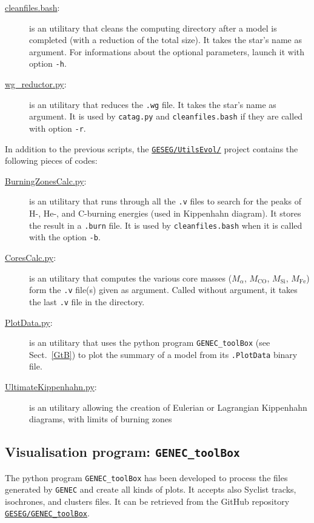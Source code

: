 \documentclass[11pt]{article}
\begin{document}
\begin{description}
\item[\underline{cleanfiles.bash}:] is an utilitary that cleans the computing directory after a model is completed (with a reduction of the total size). It takes the star's name as argument. For informations about the optional parameters, launch it with option \verb?-h?.
\item[\underline{wg\_reductor.py}:] is an utilitary that reduces the {\tt .wg} file. It takes the star's name as argument. It is used by {\tt catag.py} and {\tt cleanfiles.bash} if they are called with option \verb?-r?.
\end{description}

In addition to the previous scripts, the \href{https://github.com/GESEG/UtilsEvol}{\tt GESEG/UtilsEvol/} project contains the following pieces of codes:
\begin{description}
\item[\underline{BurningZonesCalc.py}:] is an utilitary that runs through all the {\tt .v} files to search for the peaks of H-, He-, and C-burning energies (used in Kippenhahn diagram). It stores the result in a {\tt .burn} file. It is used by {\tt cleanfiles.bash} when it is called with the option \verb?-b?.
\item[\underline{CoresCalc.py}:] is an utilitary that computes the various core masses ($M_\alpha$, $M_\text{CO}$, $M_\text{Si}$, $M_\text{Fe}$) form the {\tt .v} file(s) given as argument. Called without argument, it takes the last {\tt .v} file in the directory.
\item[\underline{PlotData.py}:] is an utilitary that uses the python program {\tt GENEC\_toolBox} (see Sect.~\ref{GtB}) to plot the summary of a model from its {\tt .PlotData} binary file.
\item[\underline{UltimateKippenhahn.py}:] is an utilitary allowing the creation of Eulerian or Lagrangian Kippenhahn diagrams, with limits of burning zones 
\end{description}

\subsection{Visualisation program: {\tt GENEC\_toolBox}\label{GtB}}
The python program {\tt GENEC\_toolBox} has been developed to process the files generated by {\tt GENEC} and create all kinds of plots. It accepts also {\sc Syclist} tracks, isochrones, and clusters files. It can be retrieved from the GitHub repository \href{https://github.com/GESEG/GENEC_toolBox}{{\tt GESEG/GENEC\_toolBox}}.\\
\end{document}
